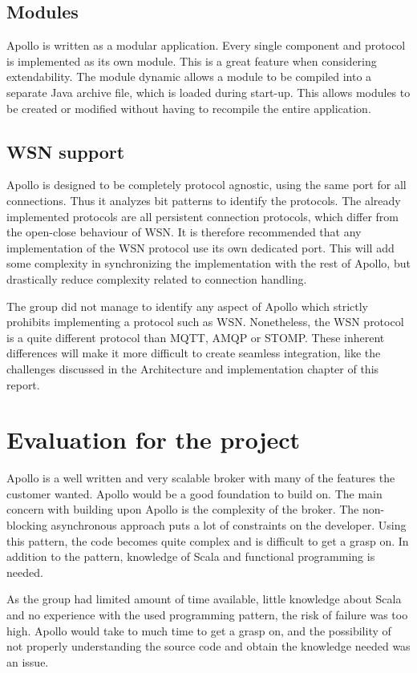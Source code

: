 \subsection{Modules}
Apollo is written as a modular application. Every single component and protocol is implemented as its own module. This is a great feature when considering extendability. The module dynamic allows a module to be compiled into a separate Java archive file, which is loaded during start-up. This allows modules to be created or modified without having to recompile the entire application.

\subsection{WSN support}
Apollo is designed to be completely protocol agnostic, using the same port for all connections. Thus it analyzes bit patterns to identify the protocols. The already implemented protocols are all persistent connection protocols, which differ from the open-close behaviour of WSN. It is therefore recommended that any implementation of the WSN protocol use its own dedicated port. This will add some complexity in synchronizing the implementation with the rest of Apollo, but drastically reduce complexity related to connection handling.

The group did not manage to identify any aspect of Apollo which strictly prohibits implementing a protocol such as WSN. Nonetheless, the WSN protocol is a quite different protocol than MQTT, AMQP or STOMP. These inherent differences will make it more difficult to create seamless integration, like the challenges discussed in the Architecture and implementation chapter of this report.

\section{Evaluation for the project}
Apollo is a well written and very scalable broker with many of the features the customer wanted. Apollo would be a good foundation to build on. The main concern with building upon Apollo is the complexity of the broker. The non-blocking asynchronous approach puts a lot of constraints on the developer. Using this pattern, the code becomes quite complex and is difficult to get a grasp on. In addition to the pattern, knowledge of Scala and functional programming is needed. 

As the group had limited amount of time available, little knowledge about Scala and no experience with the used programming pattern, the risk of failure was too high. Apollo would take to much time to get a grasp on, and the possibility of not properly understanding the source code and obtain the knowledge needed was an issue.

